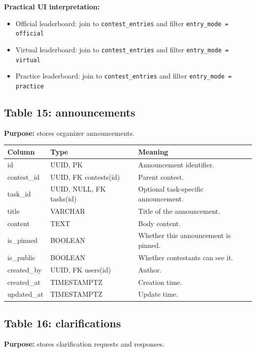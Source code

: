 \documentclass[11pt,a4paper]{article}
\begin{document}
\textbf{Practical UI interpretation:}
\begin{itemize}
    \item Official leaderboard: join to \texttt{contest\_entries} and filter \texttt{entry\_mode = official}
    \item Virtual leaderboard: join to \texttt{contest\_entries} and filter \texttt{entry\_mode = virtual}
    \item Practice leaderboard: join to \texttt{contest\_entries} and filter \texttt{entry\_mode = practice}
\end{itemize}

\subsection{Table 15: announcements}
\textbf{Purpose:} stores organizer announcements.

\begin{longtable}{>{\raggedright\arraybackslash}p{} >{\raggedright\arraybackslash}p{} >{\raggedright\arraybackslash}p{}}
\toprule
\textbf{Column} & \textbf{Type} & \textbf{Meaning} \\
\midrule
id & UUID, PK & Announcement identifier. \\
contest\_id & UUID, FK contests(id) & Parent contest. \\
task\_id & UUID, NULL, FK tasks(id) & Optional task-specific announcement. \\
title & VARCHAR & Title of the announcement. \\
content & TEXT & Body content. \\
is\_pinned & BOOLEAN & Whether this announcement is pinned. \\
is\_public & BOOLEAN & Whether contestants can see it. \\
created\_by & UUID, FK users(id) & Author. \\
created\_at & TIMESTAMPTZ & Creation time. \\
updated\_at & TIMESTAMPTZ & Update time. \\
\bottomrule
\end{longtable}

\subsection{Table 16: clarifications}
\textbf{Purpose:} stores clarification requests and responses.
\end{document}
